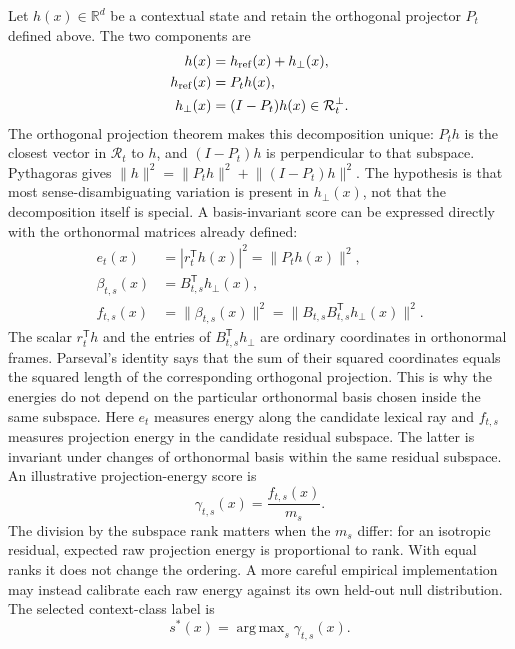 \documentclass[
  aps,
  reprint,
  superscriptaddress,
  floatfix,
  nofootinbib,
  longbibliography
]{revtex4-2}
\newcommand{\R}{\mathbb{R}}
\newcommand{\T}{^{\mathsf{T}}}
\newcommand{\norm}[1]{\lVert #1 \rVert}
\DeclareMathOperator*{\argmax}{arg\,max}
\begin{document}
Let $h(x)\in\R^d$ be a contextual state and retain the orthogonal projector
$P_t$ defined above. The two components are
%
\begin{align}
\label{eq:reference-decomp}
h(x)&=h_{\rm ref}(x)+h_\perp(x),\\
h_{\rm ref}(x)&=P_t h(x),\nonumber\\
h_\perp(x)&=(I-P_t)h(x)\in\mathcal R_t^\perp.\nonumber
\end{align}
%
The orthogonal projection theorem makes this decomposition unique:
$P_th$ is the closest vector in $\mathcal R_t$ to $h$, and $(I-P_t)h$ is
perpendicular to that subspace.  Pythagoras gives
$\norm h^2=\norm{P_th}^2+\norm{(I-P_t)h}^2$.
The hypothesis is that most sense-disambiguating variation is present in
$h_\perp(x)$, not that the decomposition itself is special.  A
basis-invariant score can be expressed directly with the orthonormal matrices
already defined:
%
\begin{align}
\label{eq:sense-coordinates}
e_t(x)&=|r_t\T h(x)|^2=\norm{P_t h(x)}^2,\nonumber\\
\beta_{t,s}(x)&=B_{t,s}\T h_\perp(x),\\
f_{t,s}(x)&=\norm{\beta_{t,s}(x)}^2
=\norm{B_{t,s}B_{t,s}\T h_\perp(x)}^2.\nonumber
\end{align}
%
The scalar $r_t\T h$ and the entries of $B_{t,s}\T h_\perp$ are ordinary
coordinates in orthonormal frames.  Parseval's identity says that the sum of their squared
coordinates equals the squared length of the corresponding orthogonal
projection.  This is why the energies do not depend on the particular
orthonormal basis chosen inside the same subspace.
Here $e_t$ measures energy along the candidate lexical ray and $f_{t,s}$
measures projection energy in the candidate residual subspace.  The latter is
invariant under changes of orthonormal basis within the same residual subspace.
An illustrative projection-energy score is
%
\begin{equation}
\label{eq:sense-score}
\gamma_{t,s}(x)=\frac{f_{t,s}(x)}{m_s}.
\end{equation}
%
The division by the subspace rank matters when the $m_s$ differ: for an
isotropic residual, expected raw projection energy is proportional to rank.
With equal ranks it does not change the ordering.  A more careful empirical
implementation may instead calibrate each raw energy against its own held-out
null distribution.
The selected context-class label is
%
\begin{equation}
\label{eq:selected-sense}
s^*(x)=\argmax_s \gamma_{t,s}(x).
\end{equation}
\end{document}
